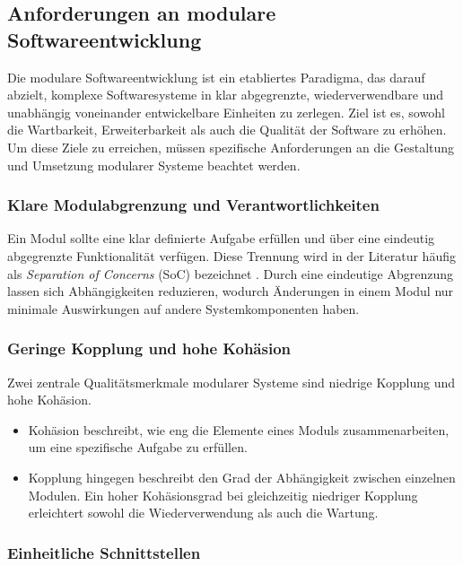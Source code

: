 \subsection{Anforderungen an modulare Softwareentwicklung}
\label{subsec:anforderungen-an-modulare-softwareentwicklung}

Die modulare Softwareentwicklung ist ein etabliertes Paradigma, das darauf abzielt, komplexe Softwaresysteme in klar abgegrenzte, wiederverwendbare und unabhängig voneinander entwickelbare Einheiten zu zerlegen.
Ziel ist es, sowohl die Wartbarkeit, Erweiterbarkeit als auch die Qualität der Software zu erhöhen.
Um diese Ziele zu erreichen, müssen spezifische Anforderungen an die Gestaltung und Umsetzung modularer Systeme beachtet werden.


\subsubsection{Klare Modulabgrenzung und Verantwortlichkeiten}

Ein Modul sollte eine klar definierte Aufgabe erfüllen und über eine eindeutig abgegrenzte Funktionalität verfügen.
Diese Trennung wird in der Literatur häufig als \textit{Separation of Concerns} (SoC) bezeichnet .
Durch eine eindeutige Abgrenzung lassen sich Abhängigkeiten reduzieren, wodurch Änderungen in einem Modul nur minimale Auswirkungen auf andere Systemkomponenten haben.


\subsubsection{Geringe Kopplung und hohe Kohäsion}

Zwei zentrale Qualitätsmerkmale modularer Systeme sind niedrige Kopplung und hohe Kohäsion.


\begin{itemize}

\item
Kohäsion beschreibt, wie eng die Elemente eines Moduls zusammenarbeiten, um eine spezifische Aufgabe zu erfüllen.
\item
Kopplung hingegen beschreibt den Grad der Abhängigkeit zwischen einzelnen Modulen.
Ein hoher Kohäsionsgrad bei gleichzeitig niedriger Kopplung erleichtert sowohl die Wiederverwendung als auch die Wartung.

\end{itemize}

\subsubsection{Einheitliche Schnittstellen}

